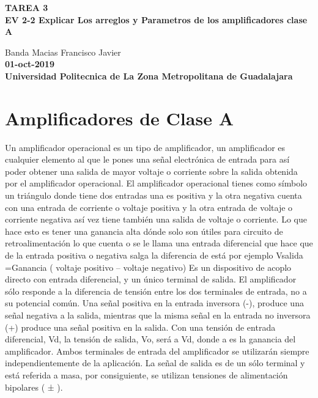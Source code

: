 \documentclass[11pt,a4paper]{article}
\begin{document}
\begin{center}
\textbf{TAREA 3}\\
\textbf{EV 2-2 Explicar Los arreglos y Parametros de los amplificadores clase A}
\end{center}

\begin{center}
Banda Macias Francisco Javier\\
\textbf{01-oct-2019}\\
\textbf{Universidad Politecnica de La Zona Metropolitana de Guadalajara}
\end{center}

\section{Amplificadores de Clase A}

Un amplificador operacional es un tipo de amplificador, un amplificador es cualquier elemento al que le pones una señal electrónica de entrada para así poder obtener una salida de mayor voltaje o corriente sobre la salida obtenida por el amplificador operacional.
El amplificador operacional tienes como símbolo un triángulo donde tiene dos entradas una es positiva y la otra negativa cuenta con una entrada de corriente o voltaje positiva y la otra entrada de voltaje o corriente negativa así vez tiene también una salida de voltaje o corriente.
Lo que hace esto es tener una ganancia alta dónde solo son útiles para circuito de retroalimentación lo que cuenta o se le llama una entrada diferencial que hace que de la entrada positiva o negativa salga la diferencia de está por ejemplo Vsalida =Ganancia ( voltaje positivo – voltaje negativo)
Es un dispositivo de acoplo directo con entrada diferencial, y un único terminal de salida. El amplificador sólo responde a la diferencia de tensión entre los dos terminales de entrada, no a su potencial común. Una señal positiva en la entrada inversora (-), produce una señal negativa a la salida, mientras que la misma señal en la entrada no inversora (+) produce una señal positiva en la salida. Con una tensión de entrada diferencial, Vd, la tensión de salida, Vo, será a Vd, donde a es la ganancia del amplificador. Ambos terminales de entrada del amplificador se utilizarán siempre independientemente de la aplicación. La señal de salida es de un sólo terminal y está referida a masa, por consiguiente, se utilizan tensiones de alimentación bipolares ( ± ).\\
\end{document}
